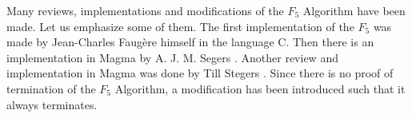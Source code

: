 Many reviews, implementations and modifications of the $F_5$ Algorithm have been made. Let us emphasize some of them. The first implementation of the $F_5$ was made by Jean-Charles Faug\`ere himself in the language C. Then there is an implementation in Magma by A. J. M. Segers \cite{Segers}. Another review and implementation in Magma was done by Till Stegers \cite{Stegers}. Since there is no proof of termination of the $F_5$ Algorithm, a modification \cite{ModifyingF5} has been introduced such that it always terminates. 
